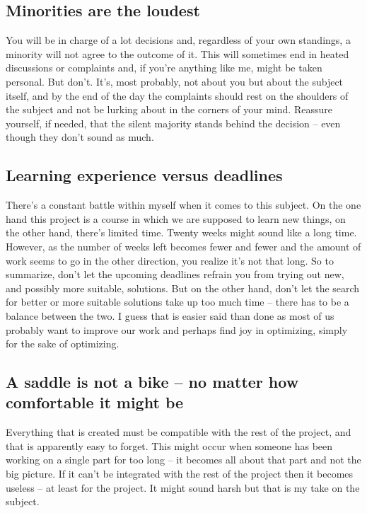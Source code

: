 \subsection{Minorities are the loudest}
You will be in charge of a lot decisions and, regardless of your own standings, a minority will not agree to the outcome of it. This will sometimes end in heated discussions or complaints and, if you're anything like me, might be taken personal. But don't. It's, most probably, not about you but about the subject itself, and by the end of the day the complaints should rest on the shoulders of the subject and not be lurking about in the corners of your mind. Reassure yourself, if needed, that the silent majority stands behind the decision -- even though they don't sound as much.
\subsection{Learning experience versus deadlines}
There's a constant battle within myself when it comes to this subject. On the one hand this project is a course in which we are supposed to learn new things, on the other hand, there's limited time. Twenty weeks might sound like a long time. However, as the number of weeks left becomes fewer and fewer and the amount of work seems to go in the other direction, you realize it's not that long. So to summarize, don't let the upcoming deadlines refrain you from trying out new, and possibly more suitable, solutions. But on the other hand, don't let the search for better or more suitable solutions take up too much time -- there has to be a balance between the two. I guess that is easier said than done as most of us probably want to improve our work and perhaps find joy in optimizing, simply for the sake of optimizing.
\subsection{A saddle is not a bike -- no matter how comfortable it might be}
Everything that is created must be compatible with the rest of the project, and that is apparently easy to forget. This might occur when someone has been working on a single part for too long -- it becomes all about that part and not the big picture. If it can't be integrated with the rest of the project then it becomes useless -- at least for the project. It might sound harsh but that is my take on the subject.